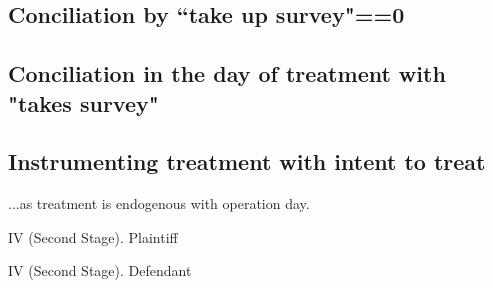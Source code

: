 \documentclass[12pt]{article}
\theoremstyle{named}
\newcommand{\folder}{C:/Users/chasi_000/Dropbox/Statistics/P10/Results/Results_2/Effect}
\begin{document}
\scriptsize{}


\pagebreak

\subsection*{Conciliation by ``take up survey"==0}


\scriptsize{}

\scriptsize{}

\scriptsize{}

\scriptsize{}


\pagebreak

\subsection*{Conciliation in the day of treatment with "takes survey"}

\begin{center}
\scriptsize{}
\end{center}

\begin{center}
\scriptsize{}
\end{center}

\begin{center}
\scriptsize{}
\end{center}

\begin{center}
\scriptsize{}
\end{center}

\pagebreak


\begin{landscape}
\subsection*{Instrumenting treatment with intent to treat}

...as treatment is endogenous with operation day.


\begin{table}[H]\centering \caption{IV (Second Stage). Plaintiff}
\begin{center}
\scriptsize{}
\end{center}
\end{table}
\begin{table}[H]\centering \caption{IV (Second Stage). Defendant}
\begin{center}
\scriptsize{}
\end{center}
\end{table}


\end{landscape}
\end{document}
